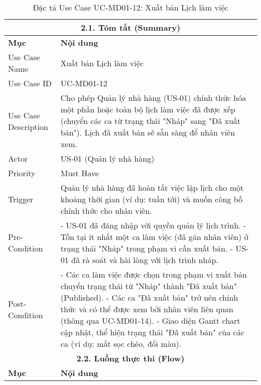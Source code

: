 \begin{longtable}{|m{4cm}|p{11cm}|}
\caption{Đặc tả Use Case UC-MD01-12: Xuất bản Lịch làm việc} \label{tab:uc_md01_12_revised} \\
\hline
\multicolumn{2}{|c|}{\textbf{2.1. Tóm tắt (Summary)}} \\
\hline
\textbf{Mục} & \textbf{Nội dung} \\
\hline
\endhead %
\hline
\endfoot %
\hline
\endlastfoot %
Use Case Name & Xuất bản Lịch làm việc \\
\hline
Use Case ID & UC-MD01-12 \\
\hline
Use Case Description & Cho phép Quản lý nhà hàng (US-01) chính thức hóa một phần hoặc toàn bộ lịch làm việc đã được xếp (chuyển các ca từ trạng thái "Nháp" sang "Đã xuất bản"). Lịch đã xuất bản sẽ sẵn sàng để nhân viên xem. \\
\hline
Actor & US-01 (Quản lý nhà hàng) \\
\hline
Priority & Must Have \\
\hline
Trigger & Quản lý nhà hàng đã hoàn tất việc lập lịch cho một khoảng thời gian (ví dụ: tuần tới) và muốn công bố chính thức cho nhân viên. \\
\hline
Pre-Condition & - US-01 đã đăng nhập với quyền quản lý lịch trình. \newline - Tồn tại ít nhất một ca làm việc (đã gán nhân viên) ở trạng thái "Nháp" trong phạm vi cần xuất bản. \newline - US-01 đã rà soát và hài lòng với lịch trình nháp. \\
\hline
Post-Condition & - Các ca làm việc được chọn trong phạm vi xuất bản chuyển trạng thái từ "Nháp" thành "Đã xuất bản" (Published). \newline - Các ca "Đã xuất bản" trở nên chính thức và có thể được xem bởi nhân viên liên quan (thông qua UC-MD01-14). \newline - Giao diện Gantt chart cập nhật, thể hiện trạng thái "Đã xuất bản" của các ca (ví dụ: mất sọc chéo, đổi màu). \\
\hline
\multicolumn{2}{|c|}{\textbf{2.2. Luồng thực thi (Flow)}} \\
\hline
\textbf{Mục} & \textbf{Nội dung} \\
\hline

\end{longtable}
